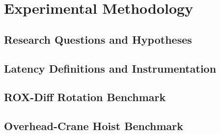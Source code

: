 
\section{Experimental Methodology}
\label{sec:methodology}

\subsection{Research Questions and Hypotheses}
\label{subsec:research_questions}

\subsection{Latency Definitions and Instrumentation}
\label{subsec:timing}

\subsection{ROX-Diff Rotation Benchmark}
\label{subsec:rox_benchmark}

\subsection{Overhead-Crane Hoist Benchmark}
\label{subsec:crane_benchmark}


